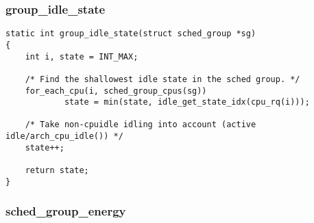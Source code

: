 \documentclass{article}
\begin{document}
\subsubsection{group\_idle\_state}

\begin{verbatim}
static int group_idle_state(struct sched_group *sg)
{
    int i, state = INT_MAX;

    /* Find the shallowest idle state in the sched group. */
    for_each_cpu(i, sched_group_cpus(sg))
            state = min(state, idle_get_state_idx(cpu_rq(i)));

    /* Take non-cpuidle idling into account (active idle/arch_cpu_idle()) */
    state++;

    return state;
}
\end{verbatim}

\subsubsection{sched\_group\_energy}
\end{document}

